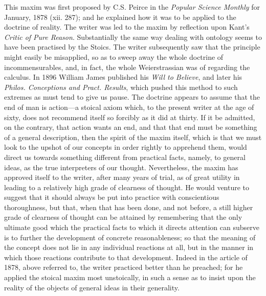 \documentclass{article}
\begin{document}
This maxim was first proposed by C.S. Peirce in the \textit{Popular Science Monthly} for January, 1878 (xii. 287); and he explained how it was to be applied to the doctrine of reality. The writer was led to the maxim by reflection upon Kant's \textit{Critic of Pure Reason}. Substantially the same way dealing with ontology seems to have been practised by the Stoics. The writer subsequently saw that the principle might easily be misapplied, so as to sweep away the whole doctrine of incommensurables, and, in fact, the whole Weierstrassian was of regarding the calculus. In 1896 William James published his \textit{Will to Believe}, and later his \textit{Philos. Conceptions and Pract. Results}, which pushed this method to such extremes as must tend to give us pause. The doctrine appears to assume that the end of man is action---a stoical axiom which, to the present writer at the age of sixty, does not recommend itself so forcibly as it did at thirty. If it be admitted, on the contrary, that action wants an end, and that that end must be something of a general description, then the spirit of the maxim itself, which is that we must look to the upshot of our concepts in order rightly to apprehend them, would direct us towards something different from practical facts, namely, to general ideas, as the true interpreters of our thought. Nevertheless, the maxim has approved itself to the writer, after many years of trial, as of great utility in leading to a relatively high grade of clearness of thought. He would venture to suggest that it should always be put into practice with conscientious thoroughness, but that, when that has been done, and not before, a still higher grade of clearness of thought can be attained by remembering that the only ultimate good which the practical facts to which it directs attention can subserve is to further the development of concrete reasonableness; so that the meaning of the concept does not lie in any individual reactions at all, but in the manner in which those reactions contribute to that development. Indeed in the article of 1878, above referred to, the writer practiced better than he preached; for he applied the stoical maxim most unstoically, in such a sense as to insist upon the reality of the objects of general ideas in their generality.
\end{document}
